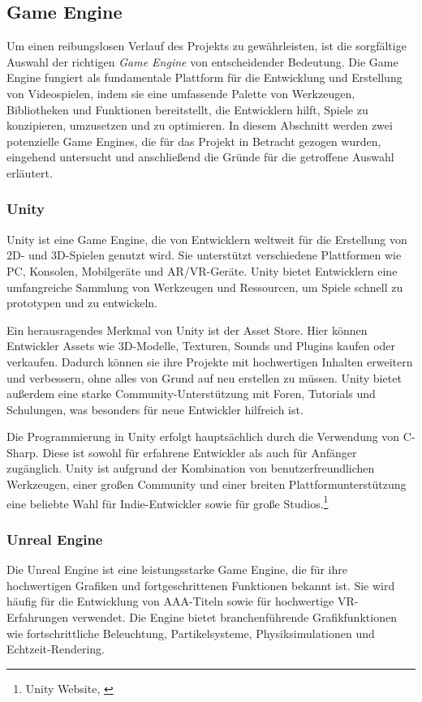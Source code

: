 \subsection{Game Engine}
Um einen reibungslosen Verlauf des Projekts zu gewährleisten, ist die sorgfältige Auswahl der richtigen \textit{Game Engine} von
entscheidender Bedeutung. Die Game Engine fungiert als fundamentale Plattform für die Entwicklung und Erstellung von
Videospielen, indem sie eine umfassende Palette von Werkzeugen, Bibliotheken und Funktionen bereitstellt, die Entwicklern
hilft, Spiele zu konzipieren, umzusetzen und zu optimieren. In diesem Abschnitt werden zwei potenzielle Game Engines,
die für das Projekt in Betracht gezogen wurden, eingehend untersucht und anschließend die Gründe für die getroffene Auswahl
erläutert.

\subsubsection{Unity}
Unity ist eine Game Engine, die von Entwicklern weltweit für die Erstellung von 2D- und 3D-Spielen genutzt wird. Sie
unterstützt verschiedene Plattformen wie PC, Konsolen, Mobilgeräte und AR/VR-Geräte. Unity bietet Entwicklern eine
umfangreiche Sammlung von Werkzeugen und Ressourcen, um Spiele schnell zu prototypen und zu entwickeln.

Ein herausragendes Merkmal von Unity ist der Asset Store. Hier können Entwickler Assets wie 3D-Modelle, Texturen, Sounds
und Plugins kaufen oder verkaufen. Dadurch können sie ihre Projekte mit hochwertigen Inhalten erweitern und verbessern,
ohne alles von Grund auf neu erstellen zu müssen. Unity bietet außerdem eine starke Community-Unterstützung mit Foren,
Tutorials und Schulungen, was besonders für neue Entwickler hilfreich ist.

Die Programmierung in Unity erfolgt hauptsächlich durch die Verwendung von C-Sharp. Diese ist sowohl für
erfahrene Entwickler als auch für Anfänger zugänglich. Unity ist aufgrund der Kombination von benutzerfreundlichen Werkzeugen,
einer großen Community und einer breiten Plattformunterstützung eine beliebte Wahl für Indie-Entwickler sowie für große Studios.\footnote{Unity Website, \cite{https://unity.com/}}

\subsubsection{Unreal Engine}
Die Unreal Engine ist eine leistungsstarke Game Engine, die für ihre hochwertigen Grafiken und fortgeschrittenen Funktionen
bekannt ist. Sie wird häufig für die Entwicklung von AAA-Titeln sowie für hochwertige VR-Erfahrungen verwendet. Die Engine
bietet branchenführende Grafikfunktionen wie fortschrittliche Beleuchtung, Partikelsysteme, Physiksimulationen und Echtzeit-Rendering.

